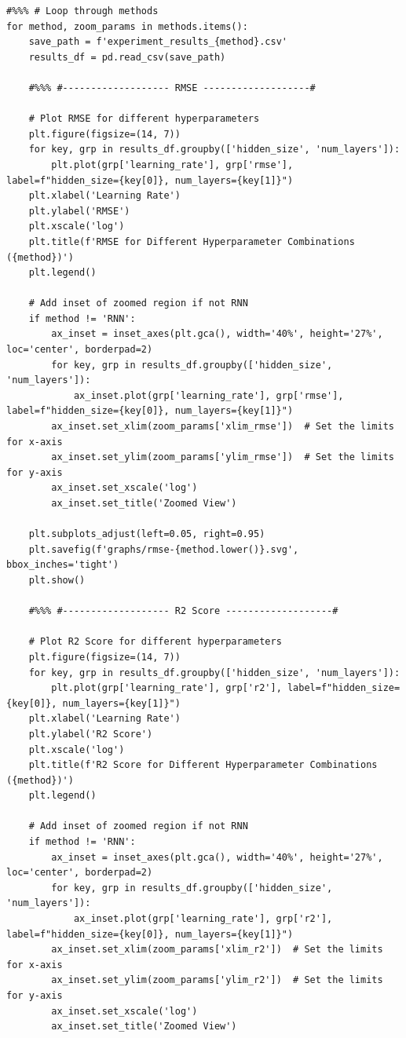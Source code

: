 \documentclass[journal,onecolumn]{IEEEtran}
\begin{document}
{\begin{appendices}
\begin{verbatim}
#%%% # Loop through methods
for method, zoom_params in methods.items():
    save_path = f'experiment_results_{method}.csv'
    results_df = pd.read_csv(save_path)

    #%%% #------------------- RMSE -------------------#

    # Plot RMSE for different hyperparameters
    plt.figure(figsize=(14, 7))
    for key, grp in results_df.groupby(['hidden_size', 'num_layers']):
        plt.plot(grp['learning_rate'], grp['rmse'], label=f"hidden_size={key[0]}, num_layers={key[1]}")
    plt.xlabel('Learning Rate')
    plt.ylabel('RMSE')
    plt.xscale('log')
    plt.title(f'RMSE for Different Hyperparameter Combinations ({method})')
    plt.legend()

    # Add inset of zoomed region if not RNN
    if method != 'RNN':
        ax_inset = inset_axes(plt.gca(), width='40%', height='27%', loc='center', borderpad=2)
        for key, grp in results_df.groupby(['hidden_size', 'num_layers']):
            ax_inset.plot(grp['learning_rate'], grp['rmse'], label=f"hidden_size={key[0]}, num_layers={key[1]}")
        ax_inset.set_xlim(zoom_params['xlim_rmse'])  # Set the limits for x-axis
        ax_inset.set_ylim(zoom_params['ylim_rmse'])  # Set the limits for y-axis
        ax_inset.set_xscale('log')
        ax_inset.set_title('Zoomed View')
    
    plt.subplots_adjust(left=0.05, right=0.95)
    plt.savefig(f'graphs/rmse-{method.lower()}.svg', bbox_inches='tight')
    plt.show()

    #%%% #------------------- R2 Score -------------------#

    # Plot R2 Score for different hyperparameters
    plt.figure(figsize=(14, 7))
    for key, grp in results_df.groupby(['hidden_size', 'num_layers']):
        plt.plot(grp['learning_rate'], grp['r2'], label=f"hidden_size={key[0]}, num_layers={key[1]}")
    plt.xlabel('Learning Rate')
    plt.ylabel('R2 Score')
    plt.xscale('log')
    plt.title(f'R2 Score for Different Hyperparameter Combinations ({method})')
    plt.legend()

    # Add inset of zoomed region if not RNN
    if method != 'RNN':
        ax_inset = inset_axes(plt.gca(), width='40%', height='27%', loc='center', borderpad=2)
        for key, grp in results_df.groupby(['hidden_size', 'num_layers']):
            ax_inset.plot(grp['learning_rate'], grp['r2'], label=f"hidden_size={key[0]}, num_layers={key[1]}")
        ax_inset.set_xlim(zoom_params['xlim_r2'])  # Set the limits for x-axis
        ax_inset.set_ylim(zoom_params['ylim_r2'])  # Set the limits for y-axis
        ax_inset.set_xscale('log')
        ax_inset.set_title('Zoomed View')


\end{verbatim}
\end{appendices}}
\end{document}
